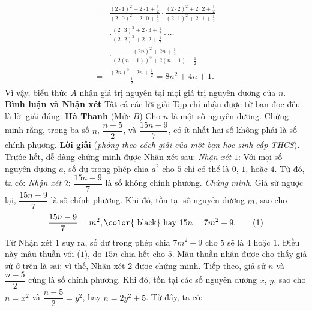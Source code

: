 \begin{multicols}{2}
\begin{align*}
		\end{align*}
			\begin{align*}
			 = &\frac{{{{\left( {2 \cdot 1} \right)}^2} + 2 \cdot 1 + \frac{1}{2}}}{{{{\left( {2 \cdot 0} \right)}^2} + 2 \cdot 0 + \frac{1}{2}}} \cdot \frac{{{{\left( {2 \cdot 2} \right)}^2} + 2 \cdot 2 + \frac{1}{2}}}{{{{\left( {2 \cdot 1} \right)}^2} + 2 \cdot 1 + \frac{1}{2}}} \\
			 &\cdot \frac{{{{\left( {2 \cdot 3} \right)}^2} + 2 \cdot 3 + \frac{1}{2}}}{{{{\left( {2 \cdot 2} \right)}^2} + 2 \cdot 2 + \frac{1}{2}}} \cdot  \cdots  \\
			 &\cdot \frac{{{{\left( {2n} \right)}^2} + 2n + \frac{1}{2}}}{{{{\left( {2\left( {n - 1} \right)} \right)}^2} + 2\left( {n - 1} \right) + \frac{1}{2}}}\\
			 = &\frac{{{{\left( {2n} \right)}^2} + 2n + \frac{1}{2}}}{{\frac{1}{2}}} = 8{n^2} + 4n + 1.
	\end{align*}
	Vì vậy, biểu thức $A$ nhận giá trị nguyên tại mọi giá trị nguyên dương của $n$.
	\vskip 0.05cm
	\textbf{\color{thachthuctoanhoc}Bình luận và Nhận xét}
	\vskip 0.05cm
	Tất cả các lời giải Tạp chí nhận được từ bạn đọc đều là lời giải đúng.
	\vskip 0.05cm
	\hfill	\textbf{\color{thachthuctoanhoc}Hà Thanh}
	\vskip 0.05cm
	{}
	(Mức $B$) Cho $n$ là một số nguyên dương. Chứng minh rằng, trong ba số $n$,  $\dfrac{n-5}2$, và $\dfrac{15n-9}7$, có ít nhất hai số không phải là số chính phương.
	\vskip 0.05cm
	\textbf{\color{thachthuctoanhoc}Lời giải} (\textit{phỏng theo cách giải của một bạn học sinh cấp THCS})\textbf{\color{thachthuctoanhoc}.}
	\vskip 0.05cm
	Trước hết, dễ dàng chứng minh được Nhận xét sau:
	\vskip 0.05cm
	\textit{Nhận xét} $1$: Với mọi số nguyên dương $a$, số dư trong phép chia $a^2$  cho $5$ chỉ có thể là $0$, $1$, hoặc $4$.
	\vskip 0.05cm
	Từ đó, ta có:
	\vskip 0.05cm
	\textit{Nhận xét} $2$: $\dfrac{15n-9}{7}$  là số không chính phương.
	\vskip 0.05cm
	\textit{Chứng minh}. Giả sử ngược lại, $\dfrac{15n-9}{7}$  là số chính phương.
	\vskip 0.05cm
	Khi đó, tồn tại số nguyên dương $m$, sao cho
	\begin{align*}
		\frac{{15n - 9}}{7} = {m^2}, \text{\color{
	black} hay } 15n = 7{m^2} + 9. \tag{$1$}
	\end{align*}
	Từ Nhận xét $1$ suy ra, số dư trong phép chia $7m^2 + 9$  cho $5$ sẽ là $4$ hoặc $1$. Điều này mâu thuẫn với ($1$), do $15n$ chia hết cho $5$. Mâu thuẫn nhận được cho thấy giả sử ở trên là sai; vì thế, Nhận xét $2$ được chứng minh.
	\vskip 0.05cm
	Tiếp theo, giả sử $n$ và $\dfrac{n-5}{2}$  cùng là số chính phương. Khi đó, tồn tại các số nguyên dương $x$, $y$, sao cho $n = x^2$  và $\dfrac{n-5}{2} = y^2$,  hay \linebreak$n = 2y^2 + 5$.  Từ đây, ta có:

\end{multicols}
